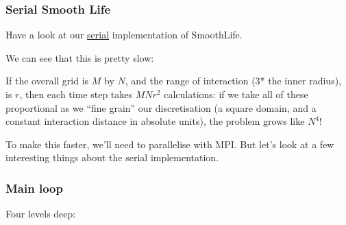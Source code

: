 \subsubsection{Serial Smooth Life}\label{serial-smooth-life}

Have a look at our
\href{https://github.com/UCL/SmoothLifeExample}{serial} implementation
of SmoothLife.

We can see that this is pretty slow:

If the overall grid is $M$ by $N$, and the range of interaction (3* the
inner radius), is $r$, then each time step takes $MNr^2$ calculations:
if we take all of these proportional as we ``fine grain'' our
discretisation (a square domain, and a constant interaction distance in
absolute units), the problem grows like $N^4$!

To make this faster, we'll need to parallelise with MPI. But let's look
at a few interesting things about the serial implementation.

\subsubsection{Main loop}\label{main-loop}

Four levels deep:

\begin{Shaded}
\begin{Highlighting}[]

 
   \NormalTok{(} 
     \NormalTok{(} 
       \NormalTok{;}
       \NormalTok{;}

       \NormalTok{(} 
           
           \NormalTok{) }\NormalTok{;}

           \NormalTok{(} 
             
             \NormalTok{) }\NormalTok{;}

             
             
          \NormalTok{\}}
      \NormalTok{\}}

    \NormalTok{\}}
  \NormalTok{\}}
\end{Highlighting}
\end{Shaded}

